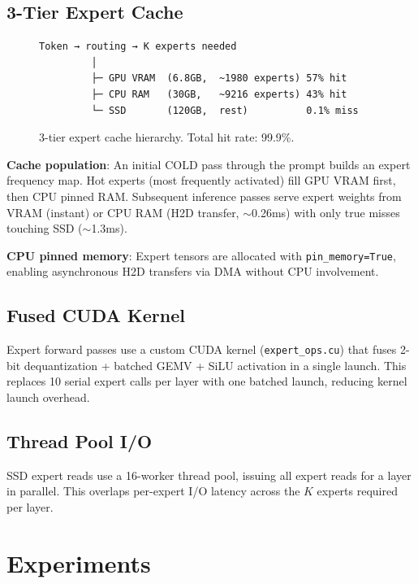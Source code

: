 \documentclass[conference]{IEEEtran}
\begin{document}
\subsection{3-Tier Expert Cache}

\begin{figure}[t]
\centering
\begin{verbatim}
Token → routing → K experts needed
         │
         ├─ GPU VRAM  (6.8GB,  ~1980 experts) 57% hit
         ├─ CPU RAM   (30GB,   ~9216 experts) 43% hit
         └─ SSD       (120GB,  rest)          0.1% miss
\end{verbatim}
\caption{3-tier expert cache hierarchy. Total hit rate: 99.9\%.}
\label{fig:cache}
\end{figure}

\textbf{Cache population}: An initial COLD pass through the prompt builds an expert frequency map. Hot experts (most frequently activated) fill GPU VRAM first, then CPU pinned RAM. Subsequent inference passes serve expert weights from VRAM (instant) or CPU RAM (H2D transfer, $\sim$0.26ms) with only true misses touching SSD ($\sim$1.3ms).

\textbf{CPU pinned memory}: Expert tensors are allocated with \texttt{pin\_memory=True}, enabling asynchronous H2D transfers via DMA without CPU involvement.

\subsection{Fused CUDA Kernel}

Expert forward passes use a custom CUDA kernel (\texttt{expert\_ops.cu}) that fuses 2-bit dequantization + batched GEMV + SiLU activation in a single launch. This replaces 10 serial expert calls per layer with one batched launch, reducing kernel launch overhead.

\subsection{Thread Pool I/O}

SSD expert reads use a 16-worker thread pool, issuing all expert reads for a layer in parallel. This overlaps per-expert I/O latency across the $K$ experts required per layer.

\section{Experiments}
\label{sec:experiments}
\end{document}
